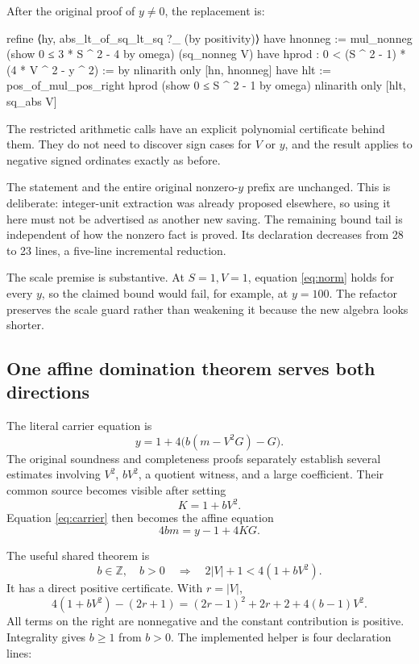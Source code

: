 \documentclass[11pt,letterpaper]{article}
\newcommand{\Z}{\mathbb Z}
\begin{document}
After the original proof of $y\ne0$, the replacement is:

\begin{Lean}
  refine ⟨hy, abs_lt_of_sq_lt_sq ?_ (by positivity)⟩
  have hnonneg := mul_nonneg
    (show 0 ≤ 3 * S ^ 2 - 4 by omega) (sq_nonneg V)
  have hprod : 0 < (S ^ 2 - 1) * (4 * V ^ 2 - y ^ 2) := by
    nlinarith only [hn, hnonneg]
  have hlt := pos_of_mul_pos_right hprod
    (show 0 ≤ S ^ 2 - 1 by omega)
  nlinarith only [hlt, sq_abs V]
\end{Lean}

The restricted arithmetic calls have an explicit polynomial certificate behind them. They do not need to discover sign cases for $V$ or $y$, and the result applies to negative signed ordinates exactly as before.

The statement and the entire original nonzero-$y$ prefix are unchanged. This is deliberate: integer-unit extraction was already proposed elsewhere, so using it here must not be advertised as another new saving. The remaining bound tail is independent of how the nonzero fact is proved. Its declaration decreases from 28 to 23 lines, a five-line incremental reduction.

The scale premise is substantive. At $S=1,V=1$, equation \eqref{eq:norm} holds for every $y$, so the claimed bound would fail, for example, at $y=100$. The refactor preserves the scale guard rather than weakening it because the new algebra looks shorter.

\subsection{One affine domination theorem serves both directions}
\label{sec:affine}

The literal carrier equation is
\begin{equation}
 y=1+4\bigl(b(m-V^2G)-G\bigr).
 \label{eq:carrier}
\end{equation}
The original soundness and completeness proofs separately establish several estimates involving $V^2$, $bV^2$, a quotient witness, and a large coefficient. Their common source becomes visible after setting
\[
 K=1+bV^2.
\]
Equation \eqref{eq:carrier} then becomes the affine equation
\begin{equation}
 \boxed{\ 4bm=y-1+4KG.\ }
 \label{eq:affine}
\end{equation}

The useful shared theorem is
\begin{equation}
 b\in\Z,\quad b>0
 \quad\Longrightarrow\quad
 2|V|+1<4(1+bV^2).
 \label{eq:domination}
\end{equation}
It has a direct positive certificate. With $r=|V|$,
\begin{equation}
 4(1+bV^2)-(2r+1)
   =(2r-1)^2+2r+2+4(b-1)V^2.
 \label{eq:domination-cert}
\end{equation}
All terms on the right are nonnegative and the constant contribution is positive. Integrality gives $b\ge1$ from $b>0$. The implemented helper is four declaration lines:
\end{document}
